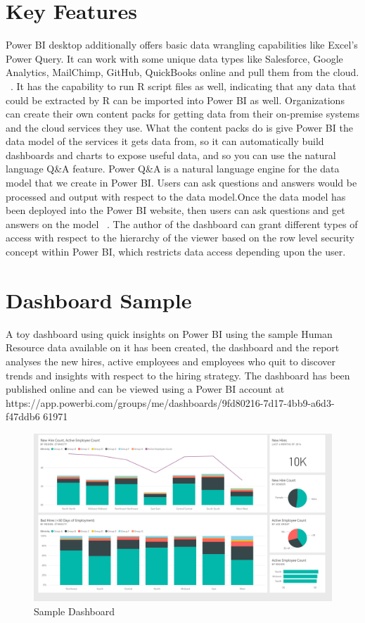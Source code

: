 \section{Key Features}
Power BI desktop additionally offers basic data wrangling capabilities like 
Excel's Power Query. It can work with some unique data types like Salesforce, 
Google Analytics, MailChimp, GitHub, QuickBooks online and pull them from the 
cloud. ~\cite{hid-sp18-418-power bi-intro}.
It has the capability to run R script files as well, indicating that any data 
that could be extracted by R can be imported into Power BI as well. 
Organizations can create their own content packs for getting data from their 
on-premise systems and the cloud services they use. What the content packs do 
is give Power BI the data model of the services it gets data from, so it can 
automatically build dashboards and charts to expose useful data, and so you 
can use the natural language Q&A feature. Power Q&A is a natural language 
engine for the data model that we create in Power BI. Users can ask questions 
and answers would be processed and output with respect to the data model.Once 
the data model has been deployed into the Power BI website, then users can ask 
questions and get answers on the model ~\cite{hid-sp18-418-power bi-intro}.
The author of the dashboard can grant different types of access with respect 
to the hierarchy of the viewer based on the row level security concept within 
Power BI, which restricts data access depending upon the user.

 
\section{Dashboard Sample}
A toy dashboard using quick insights on Power BI using the sample Human 
Resource data available on it has been created, the dashboard and the report 
analyses the new hires, active employees and employees who quit to discover 
trends and insights with respect to the hiring strategy. The dashboard has 
been published online and can be viewed using a Power BI account at 
https://app.powerbi.com/groups/me/dashboards/9fd80216-7d17-4bb9-a6d3-f47ddb6
61971

\begin{figure}[!ht]
  \centering\includegraphics[width=\columnwidth]{image/dashboard.png}
  \caption{Sample Dashboard}\label{f:Dashboard}
\end{figure}

